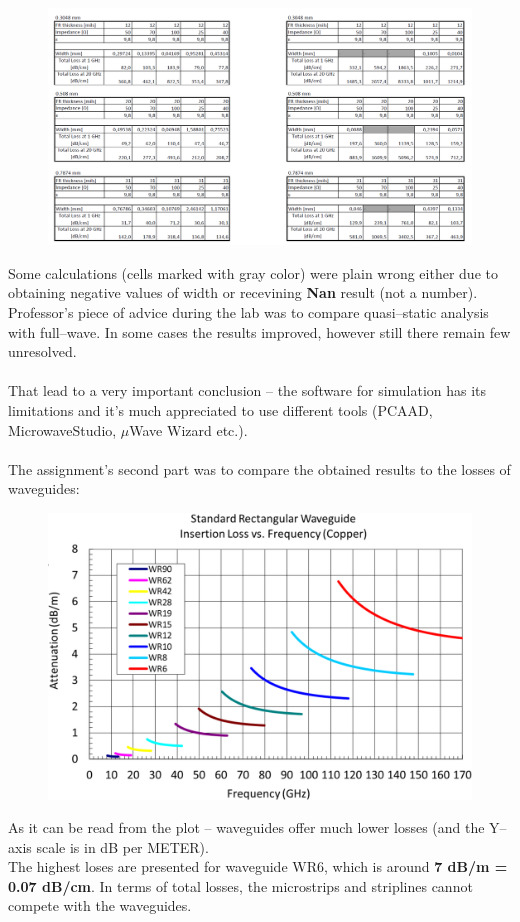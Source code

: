\documentclass[a4paper, 11pt]{report}
\begin{document}
\newpage
\begin{figure}[h]
	\centering
	\includegraphics[width=1\linewidth]{microm2}
	\label{fig:microm2}
\end{figure}
\noindent
Some calculations (cells marked with gray color) were plain wrong either due to obtaining negative values of width or recevining \textbf{Nan} result (not a number).\\
Professor's piece of advice during the lab was to compare quasi--static analysis with full--wave. In some cases the results improved, however still there remain few unresolved.\\
\\
That lead to a very important conclusion -- the software for simulation has its limitations and it's much appreciated to use different tools (PCAAD, MicrowaveStudio, $\mu$Wave Wizard etc.).\\
\\
The assignment's second part was to compare the obtained results to the losses of waveguides:
\begin{figure}[h]
	\centering
	\includegraphics[width=0.6\linewidth]{waveguides}
	\label{fig:waveguides}
\end{figure}

\noindent
As it can be read from the plot -- waveguides offer much lower losses (and the Y--axis scale is in dB per METER).\\
The highest loses are presented for waveguide WR6, which is around \textbf{7 dB/m = 0.07 dB/cm}.
In terms of total losses, the microstrips and striplines cannot compete with the waveguides. 
\newpage
\end{document}
